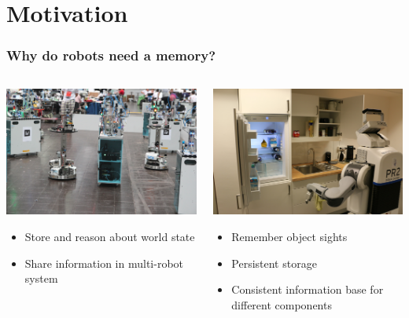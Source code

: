 \section{Motivation}
\begin{frame}
  \frametitle{Why do robots need a memory?}
  \vspace{1cm}
  \begin{columns}
    \begin{column}{0.5\textwidth}
    \includegraphics[width=\textwidth]{../thesis/img/rcll-feld}
    \begin{itemize}
    \item Store and reason about world state
    \item Share information in multi-robot system
    \end{itemize}
    \end{column}
    \begin{column}{0.5\textwidth}
    \includegraphics[width=\textwidth]{../thesis/img/pr2-kbsg-kitchen}
    \begin{itemize}
    \item Remember object sights
    \item Persistent storage
    \item Consistent information base for different components
    \end{itemize}
    \end{column}
  \end{columns}
\end{frame}

